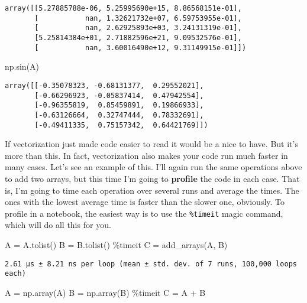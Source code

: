 \documentclass[
  letterpaper,
  DIV=11,
  numbers=noendperiod]{scrreprt}
\newenvironment{Shaded}{\begin{snugshade}}{\end{snugshade}}
\newcommand{\NormalTok}[1]{\textcolor[rgb]{0.00,0.23,0.31}{#1}}
\newcommand{\OperatorTok}[1]{\textcolor[rgb]{0.37,0.37,0.37}{#1}}
\begin{document}
\begin{verbatim}
array([[5.27885788e-06, 5.25995690e+15, 8.86568151e-01],
       [           nan, 1.32621732e+07, 6.59753955e-01],
       [           nan, 2.62925893e+03, 3.24131319e-01],
       [5.25814384e+01, 2.71882596e+21, 9.09532576e-01],
       [           nan, 3.60016490e+12, 9.31149915e-01]])
\end{verbatim}

\begin{Shaded}
\begin{Highlighting}[]
\NormalTok{np.sin(A)}
\end{Highlighting}
\end{Shaded}

\begin{verbatim}
array([[-0.35078323, -0.68131377,  0.29552021],
       [-0.66296923, -0.05837414,  0.47942554],
       [-0.96355819,  0.85459891,  0.19866933],
       [-0.63126664,  0.32747444,  0.78332691],
       [-0.49411335,  0.75157342,  0.64421769]])
\end{verbatim}

If vectorization just made code easier to read it would be a nice to
have. But it's more than this. In fact, vectorization also makes your
code run much faster in many cases. Let's see an example of this. I'll
again run the same operations above to add two arrays, but this time I'm
going to \textbf{profile} the code in each case. That is, I'm going to
time each operation over several runs and average the times. The ones
with the lowest average time is faster than the slower one, obviously.
To profile in a notebook, the easiest way is to use the
\texttt{\%timeit} magic command, which will do all this for you.

\begin{Shaded}
\begin{Highlighting}[]
\NormalTok{A }\OperatorTok{=}\NormalTok{ A.tolist()}
\NormalTok{B }\OperatorTok{=}\NormalTok{ B.tolist()}
\OperatorTok{\%}\NormalTok{timeit C }\OperatorTok{=}\NormalTok{ add\_arrays(A, B)}
\end{Highlighting}
\end{Shaded}

\begin{verbatim}
2.61 µs ± 8.21 ns per loop (mean ± std. dev. of 7 runs, 100,000 loops each)
\end{verbatim}

\begin{Shaded}
\begin{Highlighting}[]
\NormalTok{A }\OperatorTok{=}\NormalTok{ np.array(A)}
\NormalTok{B }\OperatorTok{=}\NormalTok{ np.array(B)}
\OperatorTok{\%}\NormalTok{timeit C }\OperatorTok{=}\NormalTok{ A }\OperatorTok{+}\NormalTok{ B}
\end{Highlighting}
\end{Shaded}
\end{document}
